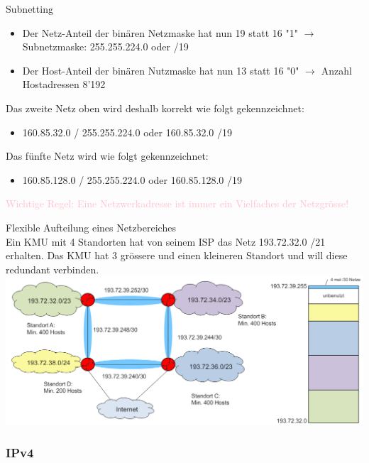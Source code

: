\begin{concept}{Subnetting}
    \begin{itemize}
        \item Der Netz-Anteil der binären Netzmaske hat nun 19 statt 16 "1" $\rightarrow$ Subnetzmaske: 255.255.224.0 oder /19
        \item Der Host-Anteil der binären Nutzmaske hat nun 13 statt 16 "0" $\rightarrow$ Anzahl Hostadressen 8'192
    \end{itemize}
    Das zweite Netz oben wird deshalb korrekt wie folgt gekennzeichnet:
    \begin{itemize}
        \item 160.85.32.0 / 255.255.224.0 oder 160.85.32.0 /19
    \end{itemize}
    Das fünfte Netz wird wie folgt gekennzeichnet:
    \begin{itemize}
        \item 160.85.128.0 / 255.255.224.0 oder 160.85.128.0 /19
    \end{itemize}
    \textcolor{pink}{Wichtige Regel: Eine Netzwerkadresse ist immer ein Vielfaches der Netzgrösse!}
\end{concept}

\begin{example2}{Flexible Aufteilung eines Netzbereiches}\\
    Ein KMU mit 4 Standorten hat von seinem ISP das Netz 193.72.32.0 /21 erhalten. Das KMU hat 3 grössere und einen kleineren Standort und will diese redundant verbinden.\\
        \includegraphics[width=1\linewidth]{images/flexible_aufteilung_netzbereich.png}    
\end{example2}

\subsubsection{IPv4}

